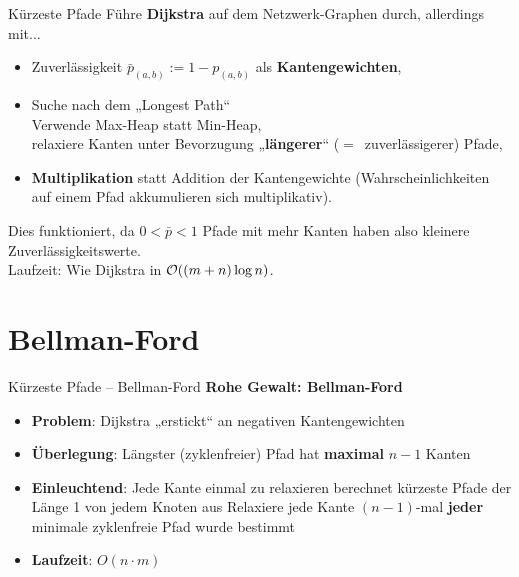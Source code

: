 \begin{frame}{Kürzeste Pfade}
	\solutionheading
	Führe \textbf{Dijkstra} auf dem Netzwerk-Graphen durch, allerdings mit...
	\begin{itemize}
		\item Zuverlässigkeit $\bar{p}_{(a,b)} := 1 - p_{(a,b)}$ als \textbf{Kantengewichten},
		\item Suche nach dem „Longest Path“ \\ 
		\impl Verwende Max-Heap statt Min-Heap, \\ 
		\impl relaxiere Kanten unter Bevorzugung „\textbf{längerer}“ {\small ($=$~zuverlässigerer)} Pfade, 
		\item \textbf{Multiplikation} statt Addition der Kantengewichte (Wahrscheinlichkeiten auf einem Pfad akkumulieren sich multiplikativ).
	\end{itemize}
	\pause
	Dies funktioniert, da $ 0 < \bar{p} < 1$ \impl Pfade mit mehr Kanten haben also kleinere Zuverlässigkeitswerte. \\
	\pause
	\smallskip
	Laufzeit: Wie Dijkstra in $\mathcal{O}\!\left((m+n) \log n\right)$.
\end{frame}

\section{Bellman-Ford}

\begin{frame}{Kürzeste Pfade – Bellman-Ford}
	\textbf{Rohe Gewalt: Bellman-Ford} 
	\begin{itemize}
		\item \textbf{Problem}: Dijkstra „erstickt“ an negativen Kantengewichten
		\pause
		\item \textbf{Überlegung}: Längster (zyklenfreier) Pfad hat \textbf{maximal} $n-1$ Kanten
		\item \textbf{Einleuchtend}: Jede Kante einmal zu relaxieren berechnet kürzeste Pfade der Länge 1 von jedem Knoten aus
		\pause
		\implitem Relaxiere jede Kante $(n-1)$-mal \impl \textbf{jeder} minimale zyklenfreie Pfad wurde bestimmt
		\pause
		\item \textbf{Laufzeit}: $O(n \cdot m)$
	\end{itemize}
\end{frame}

